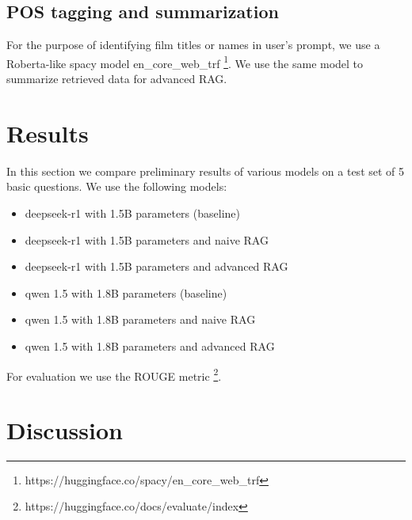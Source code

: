 \documentclass[fleqn,moreauthors,10pt]{ds_report}
\begin{document}
\subsection*{POS tagging and summarization}

For the purpose of identifying film titles or names in user's prompt, we use a Roberta-like spacy model en\_core\_web\_trf \footnote{https://huggingface.co/spacy/en\_core\_web\_trf}. We use the same model to summarize retrieved data for advanced RAG.  



\section*{Results}

In this section we compare preliminary results of various models on a test set of 5 basic questions. We use the following models:
\begin{itemize}
	\item deepseek-r1 with 1.5B parameters (baseline)
	\item deepseek-r1 with 1.5B parameters and naive RAG
	\item deepseek-r1 with 1.5B parameters and advanced RAG
	\item qwen 1.5 with 1.8B parameters (baseline)
	\item qwen 1.5 with 1.8B parameters and naive RAG
	\item qwen 1.5 with 1.8B parameters and advanced RAG
\end{itemize}

For evaluation we use the ROUGE metric \footnote{https://huggingface.co/docs/evaluate/index}.


\section*{Discussion}





\end{document}
